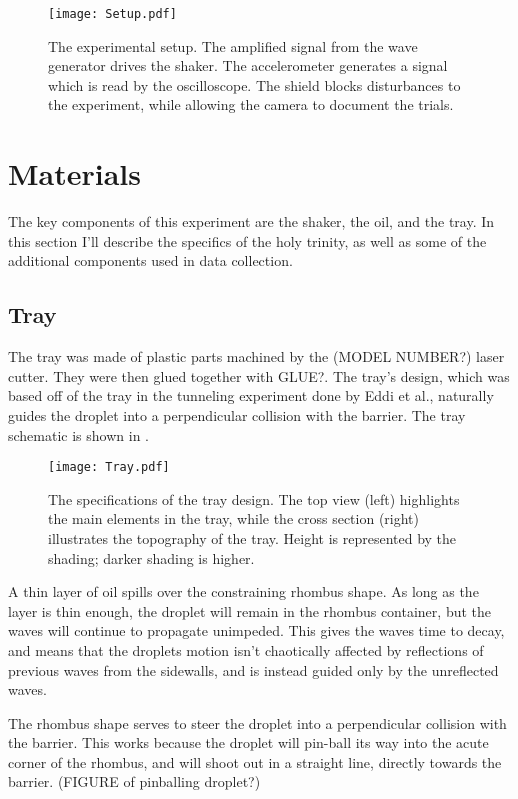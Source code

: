 \begin{figure}[h!]
	\centering
	\texttt{[image: Setup.pdf]}
	\caption{The experimental setup. The amplified signal from the wave generator drives the shaker. The accelerometer generates a signal which is read by the oscilloscope. The shield blocks disturbances to the experiment, while allowing the camera to document the trials.}
	\label{setup}
\end{figure}

\section{Materials}
The key components of this experiment are the shaker, the oil, and the tray. In this section I'll describe the specifics of the holy trinity, as well as some of the additional components used in data collection. 

\subsection{Tray}
The tray was made of plastic parts machined by the (MODEL NUMBER?) laser cutter. They were then glued together with GLUE?. The tray's design, which was based off of the tray in the tunneling experiment done by Eddi et al., naturally guides the droplet into a perpendicular collision with the barrier. The tray schematic is shown in . 

\begin{figure}[h!]
	\centering
	\texttt{[image: Tray.pdf]}
	\caption{The specifications of the tray design. The top view (left) highlights the main elements in the tray, while the cross section (right) illustrates the topography of the tray. Height is represented by the shading; darker shading is higher.}
	\label{tray}
\end{figure}

A thin layer of oil spills over the constraining rhombus shape. As long as the layer is thin enough, the droplet will remain in the rhombus container, but the waves will continue to propagate unimpeded. This gives the waves time to decay, and means that the droplets motion isn't chaotically affected by reflections of previous waves from the sidewalls, and is instead guided only by the unreflected waves. 

The rhombus shape serves to steer the droplet into a perpendicular collision with the barrier. This works because the droplet will pin-ball its way into the acute corner of the rhombus, and will shoot out in a straight line, directly towards the barrier.  (FIGURE of pinballing droplet?)

